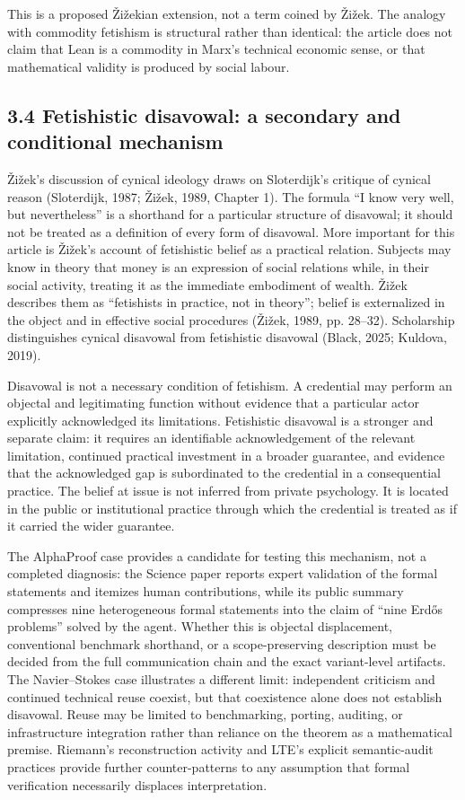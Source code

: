 \documentclass[sn-apa]{sn-jnl}
\begin{document}
This is a proposed Žižekian extension, not a term coined by Žižek. The analogy with commodity fetishism is structural rather than identical: the article does not claim that Lean is a commodity in Marx’s technical economic sense, or that mathematical validity is produced by social labour.

\subsection{3.4 Fetishistic disavowal: a secondary and conditional mechanism}

Žižek’s discussion of cynical ideology draws on Sloterdijk’s critique of cynical reason (Sloterdijk, 1987; Žižek, 1989, Chapter 1). The formula “I know very well, but nevertheless” is a shorthand for a particular structure of disavowal; it should not be treated as a definition of every form of disavowal. More important for this article is Žižek’s account of fetishistic belief as a practical relation. Subjects may know in theory that money is an expression of social relations while, in their social activity, treating it as the immediate embodiment of wealth. Žižek describes them as “fetishists in practice, not in theory”; belief is externalized in the object and in effective social procedures (Žižek, 1989, pp. 28–32). Scholarship distinguishes cynical disavowal from fetishistic disavowal (Black, 2025; Kuldova, 2019).

Disavowal is not a necessary condition of fetishism. A credential may perform an objectal and legitimating function without evidence that a particular actor explicitly acknowledged its limitations. Fetishistic disavowal is a stronger and separate claim: it requires an identifiable acknowledgement of the relevant limitation, continued practical investment in a broader guarantee, and evidence that the acknowledged gap is subordinated to the credential in a consequential practice. The belief at issue is not inferred from private psychology. It is located in the public or institutional practice through which the credential is treated as if it carried the wider guarantee.

The AlphaProof case provides a candidate for testing this mechanism, not a completed diagnosis: the Science paper reports expert validation of the formal statements and itemizes human contributions, while its public summary compresses nine heterogeneous formal statements into the claim of “nine Erdős problems” solved by the agent. Whether this is objectal displacement, conventional benchmark shorthand, or a scope-preserving description must be decided from the full communication chain and the exact variant-level artifacts. The Navier–Stokes case illustrates a different limit: independent criticism and continued technical reuse coexist, but that coexistence alone does not establish disavowal. Reuse may be limited to benchmarking, porting, auditing, or infrastructure integration rather than reliance on the theorem as a mathematical premise. Riemann’s reconstruction activity and LTE’s explicit semantic-audit practices provide further counter-patterns to any assumption that formal verification necessarily displaces interpretation.
\end{document}
